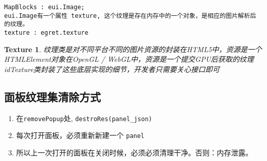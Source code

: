 \documentclass [11pt, a4paper]{article}
\begin{document}
\begin{CJK*}{UTF8}{song}
        \begin{verbatim}
MapBlocks : eui.Image;
eui.Image有一个属性 texture, 这个纹理是存在内存中的一个对象，是相应的图片解析后的纹理。
texture : egret.texture
        \end{verbatim}

        \flushleft
        \newtheorem{mur}{Texture}[section]
        \begin{mur}
            纹理类是对不同平台不同的图片资源的封装在HTML5中，资源是一个HTMLElement对象在OpenGL / WebGL中，资源是一个提交GPU后获取的纹理idTexture类封装了这些底层实现的细节，开发者只需要关心接口即可
        \end{mur}
    
        
    \subsection{面板纹理集清除方式}
    \begin{enumerate}
    \item 在\texttt{removePopup}处, \texttt{destroRes(panel\_json)}
    \item 每次打开面板，必须重新新建一个 \texttt{panel}
    \item 所以上一次打开的面板在关闭时候，必须必须清理干净。否则：内存泄露。
    \end{enumerate}

        
    \end{CJK*}
    
\end{document}
